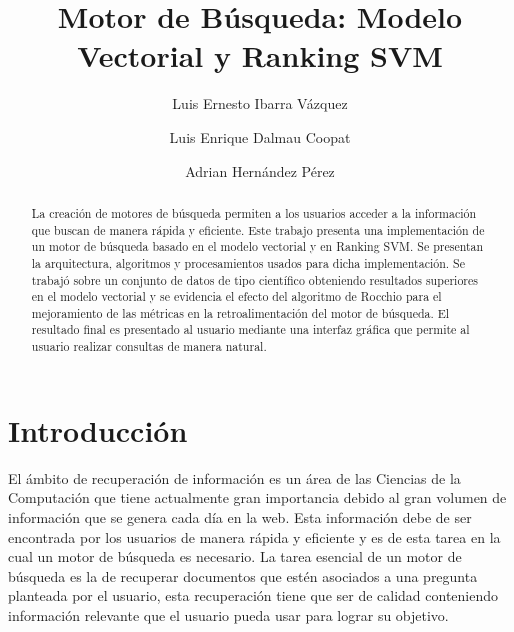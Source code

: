 \documentclass[runningheads]{llncs}
\begin{document}
%
\title{Motor de Búsqueda: Modelo Vectorial y Ranking SVM}
%
%
\author{Luis Ernesto Ibarra Vázquez \and
Luis Enrique Dalmau Coopat \and
Adrian Hernández Pérez}
%
%
%
\maketitle              %
%
\begin{abstract}
La creación de motores de búsqueda permiten a los usuarios acceder a la información
que buscan de manera rápida y eficiente. Este trabajo presenta una implementación de 
un motor de búsqueda basado en el modelo vectorial y en Ranking SVM. Se presentan la arquitectura,
algoritmos y procesamientos usados para dicha implementación. Se trabajó sobre un conjunto de datos
de tipo científico obteniendo resultados superiores en el modelo vectorial y se evidencia el efecto
del algoritmo de Rocchio para el mejoramiento de las métricas en la retroalimentación del motor de búsqueda.
El resultado final es presentado al usuario mediante una interfaz gráfica que permite
al usuario realizar consultas de manera natural.

\end{abstract}

\section{Introducción}

El ámbito de recuperación de información es un área de las Ciencias de la Computación que tiene
actualmente gran importancia debido al gran volumen de información que se genera cada día en la
web. Esta información debe de ser encontrada por los usuarios de manera rápida y eficiente y es
de esta tarea en la cual un motor de búsqueda es necesario. La tarea esencial de un motor de
búsqueda es la de recuperar documentos que estén asociados a una pregunta planteada por el usuario, 
esta recuperación tiene que ser de calidad conteniendo información relevante que el usuario pueda
usar para lograr su objetivo.
\end{document}
